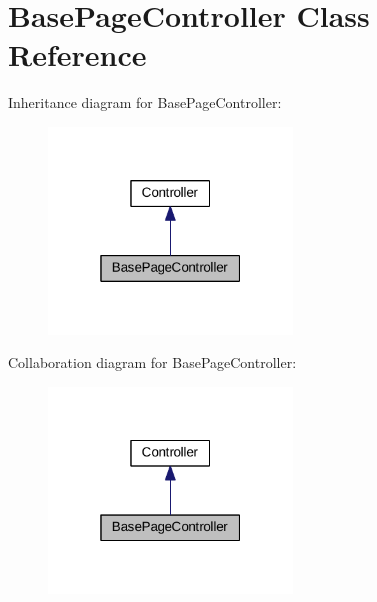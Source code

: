 \hypertarget{classBasePageController}{\section{Base\+Page\+Controller Class Reference}
\label{classBasePageController}
}


Inheritance diagram for Base\+Page\+Controller\+:\nopagebreak
\begin{figure}[H]
\begin{center}
\leavevmode
\includegraphics[width=184pt]{classBasePageController__inherit__graph}
\end{center}
\end{figure}


Collaboration diagram for Base\+Page\+Controller\+:\nopagebreak
\begin{figure}[H]
\begin{center}
\leavevmode
\includegraphics[width=184pt]{classBasePageController__coll__graph}
\end{center}
\end{figure}
